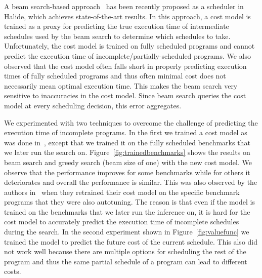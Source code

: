 A beam search-based approach~\cite{adams2019learning} has been recently proposed as a scheduler in Halide, which achieves state-of-the-art results. In this approach, a cost model is trained as a proxy for predicting the true execution time of intermediate schedules used by the beam search to determine which schedules to take. Unfortunately, the cost model is trained on fully scheduled programs and cannot predict the execution time of incomplete/partially-scheduled programs. We also observed that the cost model often falls short in properly predicting execution times of fully scheduled programs and thus often minimal cost does not necessarily mean optimal execution time. This makes the beam search very sensitive to inaccuracies in the cost model. Since beam search queries the cost model at every scheduling decision, this error aggregates. 

We experimented with two techniques to overcome the challenge of predicting the execution time of incomplete programs. In the first we trained a cost model as was done in~\cite{adams2019learning}, except that we trained it on the fully scheduled benchmarks that we later run the search on. Figure~\ref{fig:trainedbenchmarks} shows the results on beam search and greedy search (beam size of one) with the new cost model. We observe that the performance improves for some benchmarks while for others it deteriorates and overall the performance is similar. This was also observed by the authors in~\cite{adams2019learning} when they retrained their cost model on the specific benchmark programs that they were also autotuning. The reason is that even if the model is trained on the benchmarks that we later run the inference on, it is hard for the cost model to accurately predict the execution time of incomplete schedules during the search. In the second experiment shown in Figure~\ref{fig:valuefunc} we trained the model to predict the future cost of the current schedule. This also did not work well because there are multiple options for scheduling the rest of the program and thus the same partial schedule of a program can lead to different costs.

